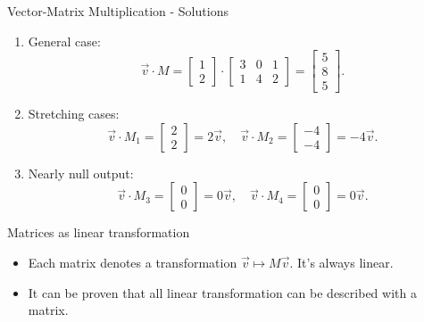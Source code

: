 \documentclass{beamer}
\begin{document}
\begin{frame}{Vector-Matrix Multiplication - Solutions}
  \begin{enumerate}
    \item General case:
    \begin{equation}
    \vec{v} \cdot M = \begin{bmatrix} 1 \\ 2 \end{bmatrix} \cdot
    \begin{bmatrix} 3 & 0 & 1 \\ 1 & 4 & 2 \end{bmatrix}
    = \begin{bmatrix} 5 \\ 8 \\ 5 \end{bmatrix}.
    \end{equation}
    \item Stretching cases:
    \begin{equation}
    \vec{v} \cdot M_1 = \begin{bmatrix} 2 \\ 2 \end{bmatrix}=2\vec{v}, \quad
    \vec{v} \cdot M_2 = \begin{bmatrix} -4 \\ -4 \end{bmatrix} = -4\vec{v}.
    \end{equation}
    \item Nearly null output:
    \begin{equation}
    \vec{v} \cdot M_3 = \begin{bmatrix} 0 \\ 0 \end{bmatrix}=0\vec{v}, \quad
    \vec{v} \cdot M_4 = \begin{bmatrix} 0 \\ 0 \end{bmatrix}=0\vec{v}.
    \end{equation}
  \end{enumerate}
\end{frame}

\begin{frame}{Matrices as linear transformation}

\begin{itemize}
    \item Each matrix denotes a transformation $\vec{v} \mapsto M\vec{v}$. It's always linear.
    \item It can be proven that all linear transformation can be described with a matrix.
    
\end{itemize}
    
\end{frame}
\end{document}
